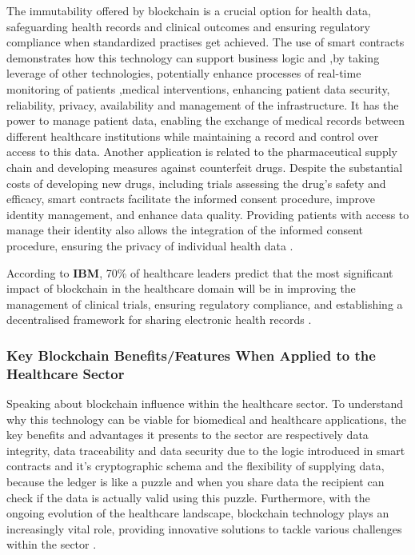 The immutability offered by blockchain is a crucial option for health data, 
safeguarding health records and clinical outcomes and ensuring regulatory compliance when 
standardized practises get achieved. The use of smart contracts demonstrates how this 
technology can support business logic and ,by taking leverage of other technologies, 
potentially enhance processes of real-time monitoring of patients ,medical interventions, 
enhancing patient data security, reliability, privacy, availability and management 
of the infrastructure. It has the power to manage patient data, enabling the exchange of medical 
records between different healthcare institutions while maintaining a record and control over access 
to this data. Another application is related to the pharmaceutical supply chain and developing
measures against counterfeit drugs. Despite the substantial costs of developing new drugs,
including trials assessing the drug's safety and efficacy, smart contracts facilitate the 
informed consent procedure, improve identity management, and enhance data quality. Providing 
patients with access to manage their identity also allows the integration of the informed consent 
procedure, ensuring the privacy of individual health data \cite{blockchain-patient-control} 
\cite{blockchain-in-healthcare-2} \cite{blockchain-counterfeit}.

According to \textbf{IBM}, 70\% of healthcare leaders predict that the most significant 
impact of blockchain in the healthcare domain will be in improving the management of clinical 
trials, ensuring regulatory compliance, and establishing a decentralised framework for sharing
electronic health records \cite{IBM-reference}.

\subsubsection{Key Blockchain Benefits/Features When Applied to the Healthcare Sector}
Speaking about blockchain influence within the healthcare sector. To understand why 
this technology can be viable for biomedical and healthcare applications, the key 
benefits and advantages it presents to the sector are respectively data integrity, 
data traceability and data security due to the logic introduced in smart contracts
and it's cryptographic schema and the flexibility of supplying data, because the 
ledger is like a puzzle and when you share data the recipient can check if the data 
is actually valid using this puzzle. Furthermore, with the ongoing evolution of 
the healthcare landscape, blockchain technology plays an increasingly vital role, 
providing innovative solutions to tackle various 
challenges within the 
sector \cite{blockchain-distributed-ledger-biomedical} 
\cite{blockchain-research-challenges}.

